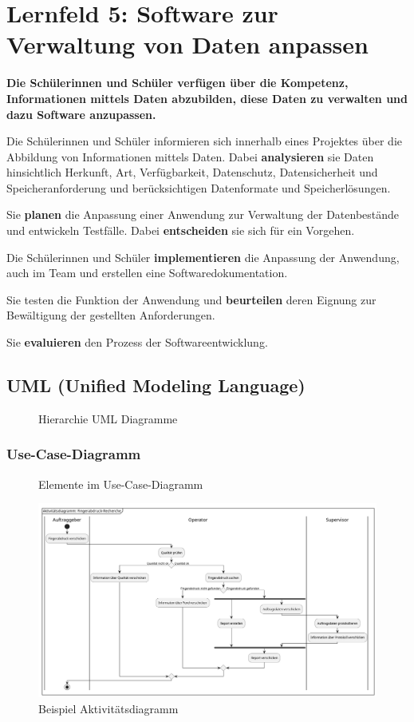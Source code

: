\chapter{Lernfeld 5: Software zur Verwaltung von Daten anpassen}

\textbf{Die Schülerinnen und Schüler verfügen über die Kompetenz, Informationen mittels
    Daten abzubilden, diese Daten zu verwalten und dazu Software anzupassen.}

Die Schülerinnen und Schüler informieren sich innerhalb eines Projektes über die Abbildung
von Informationen mittels Daten. Dabei \textbf{analysieren} sie Daten hinsichtlich Herkunft, Art,
Verfügbarkeit, Datenschutz, Datensicherheit und Speicheranforderung und berücksichtigen
Datenformate und Speicherlösungen.

Sie \textbf{planen} die Anpassung einer Anwendung zur Verwaltung der Datenbestände und entwickeln Testfälle. Dabei \textbf{entscheiden} sie sich für ein Vorgehen.

Die Schülerinnen und Schüler \textbf{implementieren} die Anpassung der Anwendung, auch im
Team und erstellen eine Softwaredokumentation.

Sie testen die Funktion der Anwendung und \textbf{beurteilen} deren Eignung zur Bewältigung der
gestellten Anforderungen.

Sie \textbf{evaluieren} den Prozess der Softwareentwicklung.


\section{UML (Unified Modeling Language)}

\begin{figure}[H]
    \centering
    
    \caption{Hierarchie UML Diagramme}
\end{figure}
\FloatBarrier

\subsection{Use-Case-Diagramm}

\begin{figure}[H]
    \centering
    
    \caption{Elemente im Use-Case-Diagramm}
\end{figure}
\FloatBarrier

\begin{figure}[H]
    \centering
    \includegraphics[width=\textwidth]{figures/activity.png}
    \caption{Beispiel Aktivitätsdiagramm}
\end{figure}